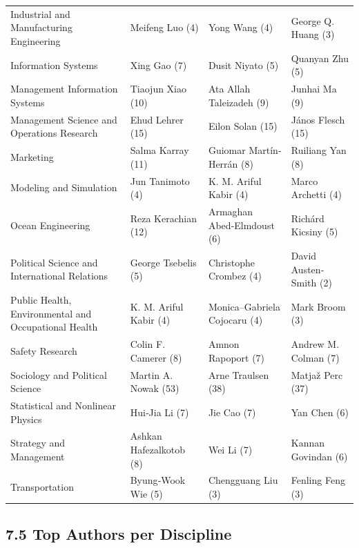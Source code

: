 \documentclass[
  12pt,
]{article}
\begin{document}
\begin{table}[H]
\begin{tabular}[t]{llll}
Industrial and Manufacturing Engineering & Meifeng Luo (4) & Yong Wang (4) & George Q. Huang (3)\\
Information Systems & Xing Gao (7) & Dusit Niyato (5) & Quanyan Zhu (5)\\
Management Information Systems & Tiaojun Xiao (10) & Ata Allah Taleizadeh (9) & Junhai Ma (9)\\
Management Science and Operations Research & Ehud Lehrer (15) & Eilon Solan (15) & János Flesch (15)\\
Marketing & Salma Karray (11) & Guiomar Martín‐Herrán (8) & Ruiliang Yan (8)\\
Modeling and Simulation & Jun Tanimoto (4) & K. M. Ariful Kabir (4) & Marco Archetti (4)\\
Ocean Engineering & Reza Kerachian (12) & Armaghan Abed‐Elmdoust (6) & Richárd Kicsiny (5)\\
Political Science and International Relations & George Tsebelis (5) & Christophe Crombez (4) & David Austen‐Smith (2)\\
Public Health, Environmental and Occupational Health & K. M. Ariful Kabir (4) & Monica–Gabriela Cojocaru (4) & Mark Broom (3)\\
Safety Research & Colin F. Camerer (8) & Amnon Rapoport (7) & Andrew M. Colman (7)\\
Sociology and Political Science & Martin A. Nowak (53) & Arne Traulsen (38) & Matjaž Perc (37)\\
Statistical and Nonlinear Physics & Hui‐Jia Li (7) & Jie Cao (7) & Yan Chen (6)\\
Strategy and Management & Ashkan Hafezalkotob (8) & Wei Li (7) & Kannan Govindan (6)\\
Transportation & Byung‐Wook Wie (5) & Chengguang Liu (3) & Fenling Feng (3)\\
\bottomrule
\end{tabular}
\end{table}

\subsection{7.5 Top Authors per
Discipline}\label{top-authors-per-discipline}
\end{document}
